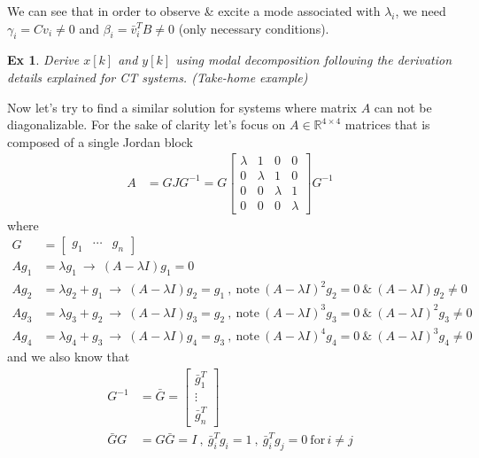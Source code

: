 \documentclass[twoside]{article}
\newtheorem{exmp}[theorem]{Ex}
\begin{document}
%
We can see that in order to observe \& excite a mode associated with $\lambda_i$, we need $\gamma_i = C v_i \neq 0$ and $\beta_i = \bar{v}_i^T B \neq 0$ (only necessary conditions).
%
\begin{exmp}
	Derive $x[k]$ and $y[k]$ using modal decomposition following the derivation details explained for CT systems. (Take-home example)
\end{exmp}

Now let's try to find a similar solution for systems where matrix $A$ can not be diagonalizable. For the sake of clarity let's focus on $A \in \mathbb{R}^{4 \times 4}$
matrices that is composed of a single Jordan block
%
\begin{align*}
A &= G J G^{-1} = G \left[  \begin{array}{ccccc} \lambda & 1 & 0 & 0  \\ 0 & \lambda & 1 & 0  \\ 
0 & 0 & \lambda & 1 \\  0 & 0  & 0  & \lambda \end{array} \right] G^{-1} 
\end{align*}
%
\noindent where
%
\begin{align*}
	 G &= \left[ \begin{array}{ccc} g_1 & \cdots & g_n \end{array} \right]
	 \\
 A g_1 &= \lambda g_1 \ \rightarrow \ (A - \lambda I) g_1 = 0
	\\
	A g_2 &= \lambda g_2 + g_1 \ \rightarrow \ (A - \lambda I) g_2 = g_1 \ , \ \mathrm{note} \ (A - \lambda I)^2 g_2 = 0 \ \& \ (A - \lambda I) g_2 \neq 0
		\\
	A g_3 &= \lambda g_3 + g_2 \ \rightarrow \ (A - \lambda I) g_3 = g_2 \ , \ \mathrm{note} \ (A - \lambda I)^3 g_3 = 0 \ \& \ (A - \lambda I)^2 g_3 \neq 0
	\\
	A g_{4} &= \lambda g_{4} + g_{3} \ \rightarrow \ (A - \lambda I) g_4 = g_{3} \ , \ \mathrm{note} \ (A - \lambda I)^4 g_4 = 0 \ \& \ (A - \lambda I)^{3} g_{4} \neq 0
\end{align*}
%
and we also know that
\begin{align*}
 G^{-1} &= \bar{G} =  \left[ \begin{array}{c} \bar{g}_1^T \\ \vdots \\ \bar{g}_n^T \end{array} \right] 
  \\
\bar{G} G &= G \bar{G} = I \ , \ \bar{g}_i^T g_i = 1 \ , \  \bar{g}_i^T g_j = 0 \ \mathrm{for} \, i \neq j
\end{align*}
\end{document}
